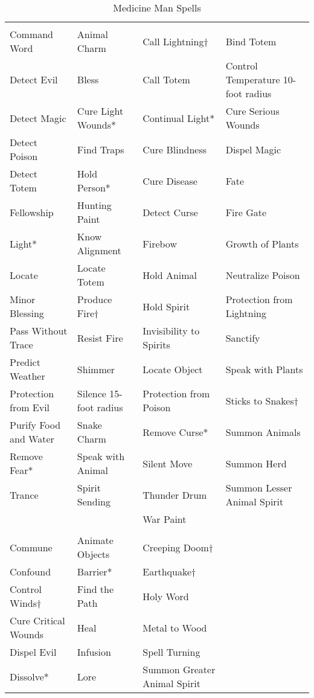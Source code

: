 \begin {table}[H]
  \caption{Medicine Man Spells}
  \begin{tabularx}{\columnwidth}{YYYY}
	 &  &  & \\
	Command Word & Animal Charm & Call Lightning† & Bind Totem\\
	Detect Evil & Bless & Call Totem & Control Temperature 10-foot radius\\
	Detect Magic & Cure Light Wounds* & Continual Light* & Cure Serious Wounds\\
	Detect Poison & Find Traps & Cure Blindness & Dispel Magic\\
	Detect Totem & Hold Person* & Cure Disease & Fate\\
	Fellowship & Hunting Paint & Detect Curse & Fire Gate\\
	Light* & Know Alignment & Firebow & Growth of Plants\\
	Locate & Locate Totem & Hold Animal & Neutralize Poison\\
	Minor Blessing & Produce Fire† & Hold Spirit & Protection from Lightning\\
	Pass Without Trace & Resist Fire & Invisibility to Spirits & Sanctify\\
	Predict Weather & Shimmer & Locate Object & Speak with Plants\\
	Protection from Evil & Silence 15-foot radius & Protection from Poison & Sticks to Snakes†\\
	Purify Food and Water & Snake Charm & Remove Curse* & Summon Animals\\
	Remove Fear* & Speak with Animal & Silent Move & Summon Herd\\
	Trance & Spirit Sending & Thunder Drum & Summon Lesser Animal Spirit\\
	&  & War Paint &\\
	 &  & \\
	Commune & Animate Objects & Creeping Doom†\\
	Confound & Barrier* & Earthquake†\\
	Control Winds† & Find the Path & Holy Word\\
	Cure Critical Wounds & Heal & Metal to Wood\\
	Dispel Evil & Infusion & Spell Turning\\
	Dissolve* & Lore & Summon Greater Animal Spirit\\

\end{tabularx}
\end{table}
